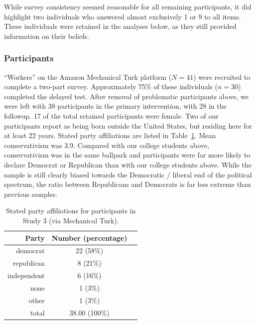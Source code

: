 While survey consistency seemed reasonable for all remaining participants, it
did highlight two individuals who answered almost exclusively 1 or 9 to all
items. These individuals were retained in the analyses below, as they still
provided information on their beliefs. 


\subsubsection{Participants}

“Workers” on the Amazon Mechanical Turk platform ($N=41$) were recruited to
complete a two-part survey. Approximately 75\% of these individuals ($n=30$)
completed the delayed test. After removal of problematic participants above, we
were left with 38 participants in the primary intervention, with 28 in the
followup. 17 of the total retained participants were female. Two of our
participants report as being born outside the United States, but residing here
for at least 22 years. Stated party affiliations are listed in
Table~\ref{table:cco-mech-party}. Mean conservativism was 3.9. Compared with our
college students above, conservativism was in the same ballpark and participants
were far more likely to declare Democrat or Republican than
with our college students above. While the sample is still clearly biased
towards the Democratic / liberal end of the political spectrum, the ratio
between Republicans and Democrats is far less extreme than previous samples. 

\begin{table}[ht]
    \caption{Stated party affiliations for participants in Study 3 (via
        Mechanical Turk).}
    \label{table:cco-mech-party}
\centering
\begin{tabular}{rcc}
  \toprule
 Party & Number (percentage) \\ 
  \midrule
  democrat     & 22 (58\%) \\ 
  republican   & 8 (21\%) \\ 
  independent  & 6 (16\%) \\ 
  none         & 1 (3\%) \\ 
  other        & 1 (3\%) \\ 
  \midrule
  total        & 38.00 (100\%) \\ 
   \bottomrule
\end{tabular}
\end{table}

